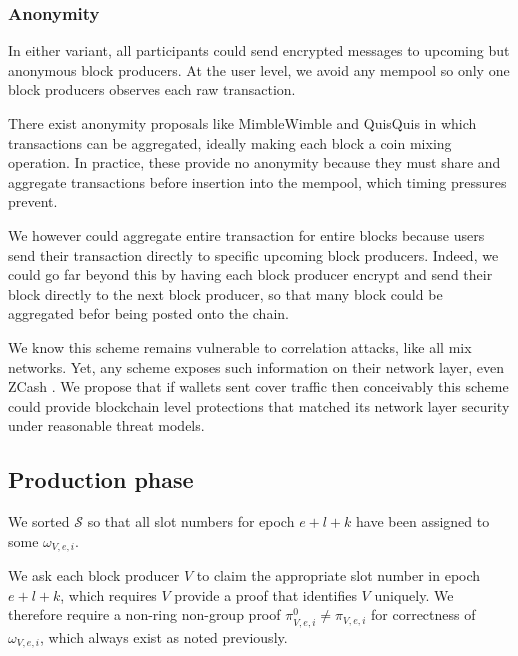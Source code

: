 \subsubsection{Anonymity}

In either variant, all participants could send encrypted messages to upcoming but anonymous block producers.  At the user level, we avoid any mempool so only one block producers observes each raw transaction.  

There exist anonymity proposals like MimbleWimble \cite{MimbleWimble} and QuisQuis \cite{QuisQuis} in which transactions can be aggregated, ideally making each block a coin mixing operation.  In practice, these provide no anonymity because they must share and aggregate transactions before insertion into the mempool, which timing pressures prevent.  

We however could aggregate entire transaction for entire blocks because users send their transaction directly to specific upcoming block producers.  Indeed, we could go far beyond this by having each block producer encrypt and send their block directly to the next block producer, so that many block could be aggregated befor being posted onto the chain.

We know this scheme remains vulnerable to correlation attacks, like all mix networks.  Yet, any scheme exposes such information on their network layer, even ZCash \cite{ZCash_vulnerable_2019}.  We propose that if wallets sent cover traffic then conceivably this scheme could provide blockchain level protections that matched its network layer security under reasonable threat models. 


\subsection{Production phase}\label{subsec:production_phase}

We sorted $\mathcal{S}$ so that all slot numbers for epoch $e+l+k$ have been assigned to some $\omega_{V,e,i}$.  

We ask each block producer $V$ to claim the appropriate slot number in epoch $e+l+k$, which requires $V$ provide a proof that identifies $V$ uniquely.  
We therefore require a non-ring non-group proof $\pi^0_{V,e,i} \ne \pi_{V,e,i}$ for correctness of $\omega_{V,e,i}$, which always exist as noted previously.

